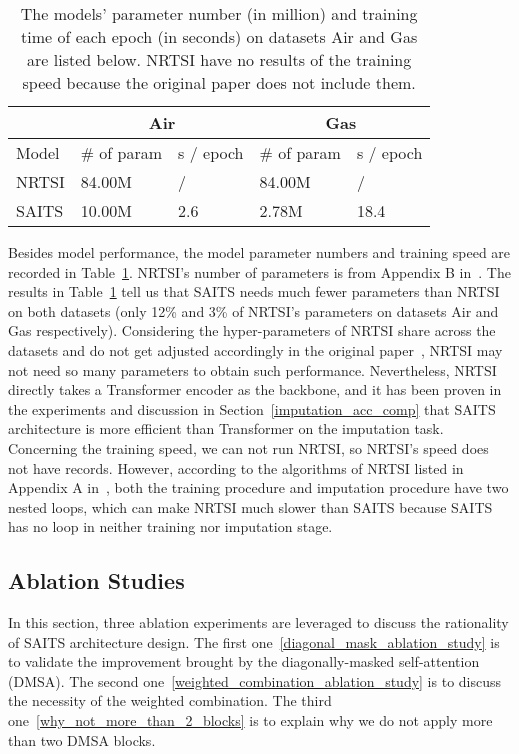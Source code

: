 \documentclass{article}
\begin{document}
\begin{table}[!htb]
	\centering
	\caption{The models' parameter number (in million) and training time of each epoch (in seconds) on datasets Air and Gas are listed below. NRTSI have no results of the training speed because the original paper does not include them.}
	\label{tb:NRTSI_SAITS_param_speed}
	\begin{tabular}{p{50pt}<{\centering}|p{60pt}<{\centering}|p{60pt}<{\centering}|p{60pt}<{\centering}|p{60pt}<{\centering}}
		\toprule
		&   \multicolumn{2}{c|}{Air}	& \multicolumn{2}{c}{Gas}		\\
		\midrule
		Model         & \# of param   & s / epoch  & \# of param   & s / epoch  \\
		\midrule
		NRTSI         & 84.00M        &  /       &  84.00M       &   /       \\
		\midrule
		SAITS         & 10.00M        & 2.6      &  \phantom{0}2.78M   & 18.4 \\
		\bottomrule
	\end{tabular}
\end{table}

Besides model performance, the model parameter numbers and training speed are recorded in Table~\ref{tb:NRTSI_SAITS_param_speed}. NRTSI's number of parameters is from Appendix B in~\cite{Shan2021NRTSI}. The results in Table~\ref{tb:NRTSI_SAITS_param_speed} tell us that SAITS needs much fewer parameters than NRTSI on both datasets (only 12\% and 3\% of NRTSI's parameters on datasets Air and Gas respectively). Considering the hyper-parameters of NRTSI share across the datasets and do not get adjusted accordingly in the original paper~\cite{Shan2021NRTSI}, NRTSI may not need so many parameters to obtain such performance. Nevertheless, NRTSI directly takes a Transformer encoder as the backbone, and it has been proven in the experiments and discussion in Section~\ref{imputation_acc_comp} that SAITS architecture is more efficient than Transformer on the imputation task. Concerning the training speed, we can not run NRTSI, so NRTSI's speed does not have records. However, according to the algorithms of NRTSI listed in Appendix A in~\cite{Shan2021NRTSI}, both the training procedure and imputation procedure have two nested loops, which can make NRTSI much slower than SAITS because SAITS has no loop in neither training nor imputation stage.

\subsection{Ablation Studies} \label{ablation experiments}
In this section, three ablation experiments are leveraged to discuss the rationality of SAITS architecture design. The first one~\ref{diagonal_mask_ablation_study} is to validate the improvement brought by the diagonally-masked self-attention (DMSA). The second one~\ref{weighted_combination_ablation_study} is to discuss the necessity of the weighted combination. The third one~\ref{why_not_more_than_2_blocks} is to explain why we do not apply more than two DMSA blocks. 
\end{document}

